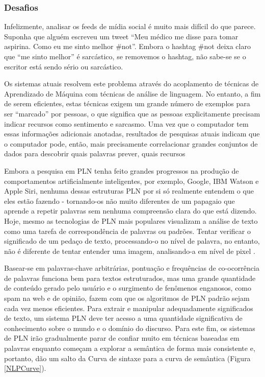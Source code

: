 \documentclass[
	12pt,				%
	openright,			%
	oneside,			%
	a4paper,			%
	english,			%
	spanish,			%
	brazil				%
	]{abntex2}
\begin{document}
	\subsubsection*{Desafios}
Infelizmente, analisar os feeds de mídia social é muito mais difícil do que parece. Suponha que alguém escreveu um tweet ``Meu médico me disse para tomar aspirina. Como eu me sinto melhor \#not''. Embora o hashtag \#not deixa claro que ``me sinto melhor'' é sarcástico, se removemos o hashtag, não sabe-se se o escritor está sendo sério ou sarcástico.

Os sistemas atuais resolvem este problema através do acoplamento de técnicas de Aprendizado de Máquina com técnicas de análise de linguagem. No entanto, a fim de serem eficientes, estas técnicas exigem um grande número de exemplos para ser ``marcado'' por pessoas, o que significa que as pessoas explicitamente precisam indicar recursos como sentimento e sarcasmo. Uma vez que o computador tem essas informações adicionais anotadas, resultados de pesquisas atuais indicam que o computador pode, então, mais precisamente correlacionar grandes conjuntos de dados para descobrir quais palavras prever, quais recursos %

Embora a pesquisa em PLN tenha feito grandes progressos na produção de comportamentos artificialmente inteligentes, por exemplo, Google, IBM Watson e Apple Siri, nenhuma dessas estruturas PLN por si só realmente entendem o que eles estão fazendo - tornando-os não muito diferentes de um papagaio que aprende a repetir palavras sem nenhuma compreensão clara do que está dizendo. Hoje, mesmo as tecnologias de PLN mais populares visualizam a análise de texto como uma tarefa de correspondência de palavras ou padrões. Tentar verificar o significado de um pedaço de texto, processando-o no nível de palavra, no entanto, não é diferente de tentar entender uma imagem, analisando-a em nível de pixel \cite{book_Cambria2015}. 

Basear-se em palavras-chave arbitrárias, pontuação e frequências de co-ocorrência de palavras funciona bem para textos estruturados, mas uma grande quantidade de conteúdo gerado pelo usuário e o surgimento de fenômenos enganosos, como spam na web e de opinião, fazem com que os algoritmos de PLN padrão sejam cada vez menos eficientes. Para extrair e manipular adequadamente significados de texto, um sistema PLN deve ter acesso a uma quantidade significativa de conhecimento sobre o mundo e o domínio do discurso.
Para este fim, os sistemas de PLN irão gradualmente parar de confiar muito em técnicas baseadas em palavras enquanto começam a explorar a semântica de forma mais consistente e, portanto, dão um salto da Curva de sintaxe para a curva de semântica (Figura \ref{NLPCurve}).
\end{document}
